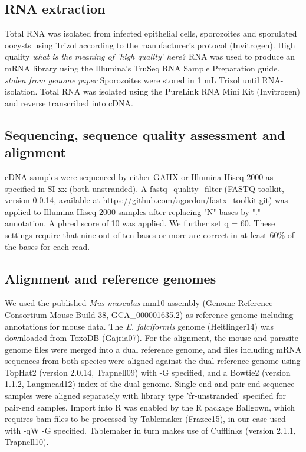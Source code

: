 \documentclass{bmcart}
\begin{document}
\subsection{RNA extraction}
Total RNA was isolated from infected epithelial cells, sporozoites and
sporulated oocysts using Trizol according to the manufacturer’s
protocol (Invitrogen). High quality \emph{what is the meaning of 'high
  quality' here?}  RNA was used to produce an mRNA library using the
Illumina’s TruSeq RNA Sample Preparation guide.  \emph{stolen from
  genome paper} Sporozoites were stored in 1 mL Trizol until
RNA-isolation.  Total RNA was isolated using the PureLink RNA Mini Kit
(Invitrogen) and reverse transcribed into cDNA.

\subsection{Sequencing, sequence quality assessment and alignment}
cDNA samples were sequenced by either GAIIX or Illumina Hiseq 2000 as
specified in SI xx (both unstranded). A fastq\_quality\_filter
(FASTQ-toolkit, version 0.0.14, available at
https://github.com/agordon/fastx\_toolkit.git) was applied to Illumina
Hiseq 2000 samples after replacing "N" bases by "." annotation.  A
phred score of 10 was applied. We further set q = 60. These settings
require that nine out of ten bases or more are correct in at least
60\% of the bases for each read.

\subsection{Alignment and reference genomes}
We used the published \textit{Mus musculus} mm10 assembly (Genome
Reference Consortium Mouse Build 38, GCA\_000001635.2) as reference
genome including annotations for mouse data. The
\textit{E. falciformis} genome (Heitlinger14) was downloaded from
ToxoDB (Gajria07). For the alignment, the mouse and parasite genome
files were merged into a dual reference genome, and files including
mRNA sequences from both species were aligned against the dual
reference genome using TopHat2 (version 2.0.14, Trapnell09) with -G
specified, and a Bowtie2 (version 1.1.2, Langmead12) index of the dual
genome. Single-end and pair-end sequence samples were aligned
separately with library type 'fr-unstranded' specified for pair-end
samples. Import into R was enabled by the R package Ballgown, which
requires bam files to be processed by Tablemaker (Frazee15), in our
case used with -qW -G specified. Tablemaker in turn makes use of
Cufflinks (version 2.1.1, Trapnell10).
\end{document}
